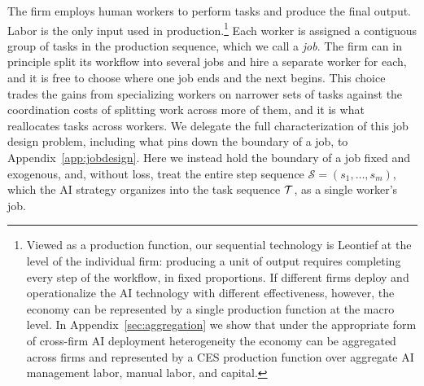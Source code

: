 The firm employs human workers to perform tasks and produce the final output.
Labor is the only input used in production.\footnote{
Viewed as a production function, our sequential technology is Leontief at the level of the individual firm: producing a unit of output requires completing every step of the workflow, in fixed proportions.
If different firms deploy and operationalize the AI technology with different effectiveness, however, the economy can be represented by a single production function at the macro level. In Appendix~\ref{sec:aggregation} we show that under the appropriate form of cross-firm AI deployment heterogeneity the economy can be aggregated across firms and represented by a CES production function over aggregate AI management labor, manual labor, and capital.
}
Each worker is assigned a contiguous group of tasks in the production sequence, which we call a \emph{job}.
The firm can in principle split its workflow into several jobs and hire a separate worker for each, and it is free to choose where one job ends and the next begins.
This choice trades the gains from specializing workers on narrower sets of tasks against the coordination costs of splitting work across more of them, and it is what reallocates tasks across workers.
We delegate the full characterization of this job design problem, including what pins down the boundary of a job, to Appendix~\ref{app:jobdesign}.
Here we instead hold the boundary of a job fixed and exogenous, and, without loss, treat the entire step sequence $\mathcal{S} = (s_1, \dotsc, s_m)$, which the AI strategy organizes into the task sequence $\mathcal{T}$, as a single worker's job.

